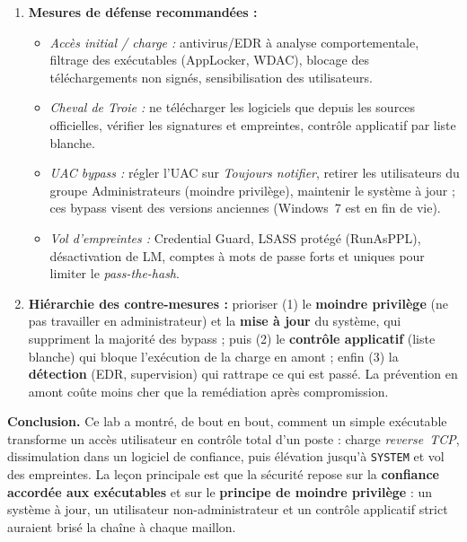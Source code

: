 \documentclass[11pt,a4paper]{article}
\begin{document}
\begin{enumerate}[leftmargin=1.6em]
  \item \textbf{Mesures de défense recommandées :}
  \begin{itemize}[leftmargin=1.2em]
    \item \emph{Accès initial / charge :} antivirus/EDR à analyse comportementale, filtrage
          des exécutables (AppLocker, WDAC), blocage des téléchargements non signés,
          sensibilisation des utilisateurs.
    \item \emph{Cheval de Troie :} ne télécharger les logiciels que depuis les sources
          officielles, vérifier les signatures et empreintes, contrôle applicatif par
          liste blanche.
    \item \emph{UAC bypass :} régler l'UAC sur \emph{Toujours notifier}, retirer les
          utilisateurs du groupe Administrateurs (moindre privilège), maintenir le système à
          jour ; ces bypass visent des versions anciennes (Windows~7 est en fin de vie).
    \item \emph{Vol d'empreintes :} Credential Guard, LSASS protégé (RunAsPPL), désactivation
          de LM, comptes à mots de passe forts et uniques pour limiter le
          \emph{pass-the-hash}.
  \end{itemize}

  \item \textbf{Hiérarchie des contre-mesures :} prioriser (1) le \textbf{moindre privilège}
        (ne pas travailler en administrateur) et la \textbf{mise à jour} du système, qui
        suppriment la majorité des bypass ; puis (2) le \textbf{contrôle applicatif} (liste
        blanche) qui bloque l'exécution de la charge en amont ; enfin (3) la
        \textbf{détection} (EDR, supervision) qui rattrape ce qui est passé. La prévention en
        amont coûte moins cher que la remédiation après compromission.
\end{enumerate}

\medskip
\noindent\textbf{Conclusion.} Ce lab a montré, de bout en bout, comment un simple exécutable
transforme un accès utilisateur en contrôle total d'un poste : charge \emph{reverse~TCP},
dissimulation dans un logiciel de confiance, puis élévation jusqu'à \texttt{SYSTEM} et vol des
empreintes. La leçon principale est que la sécurité repose sur la \textbf{confiance accordée
aux exécutables} et sur le \textbf{principe de moindre privilège} : un système à jour, un
utilisateur non-administrateur et un contrôle applicatif strict auraient brisé la chaîne à
chaque maillon.

\end{document}
